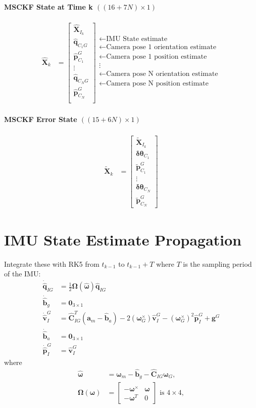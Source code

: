 \documentclass[10pt,letterpaper,fleqn,oneside]{article}
\newcommand{\nl}{\\[0.5em]}
\def\Vec#1{\mathbf{#1}} %
\newcommand{\bbm}{\begin{bmatrix}}
\newcommand{\ebm}{\end{bmatrix}}
\begin{document}
\paragraph{MSCKF State at Time k $((16+7N)\times1)$}
\begin{align}
\hat{\Vec{X}}_k &= \bbm	\hat{\Vec{X}}_{I_k} \nl
										\hat{\Vec{q}}_{C_1 G} \nl
										\hat{\Vec{p}}^G_{C_1} \nl
										\vdots \nl
										\hat{\Vec{q}}_{C_N G} \nl
										\hat{\Vec{p}}^G_{C_N} \nl										
								\ebm
								\begin{array}{l}
								\leftarrow \text{IMU State estimate} \nl
								\leftarrow \text{Camera pose 1 orientation estimate} \nl
								\leftarrow \text{Camera pose 1 position estimate} \nl
								\vdots \nl
								\leftarrow \text{Camera pose N orientation estimate} \nl
								\leftarrow \text{Camera pose N position estimate} \nl
								\end{array}		
\end{align}

\paragraph{MSCKF Error State $((15 + 6N) \times 1)$}
\begin{align}
\widetilde{\Vec{X}}_k &= \bbm	\widetilde{\Vec{X}}_{I_k} \nl
											\boldsymbol{\delta\theta}_{C_1} \nl
											\widetilde{\Vec{p}}^G_{C_1} \nl
											\vdots \nl
											\boldsymbol{\delta\theta}_{C_N} \nl
											\widetilde{\Vec{p}}^G_{C_N}
								\ebm
\end{align}

\section{IMU State Estimate Propagation}
Integrate these with RK5 from $t_{k-1}$ to $t_{k-1} + T$ where $T$ is the sampling period of the IMU:
\begin{align}
\dot{\hat{\Vec{q}}}_{I G} &= \frac{1}{2}\boldsymbol{\Omega}\left(\hat{\boldsymbol{\omega}}\right)\hat{\Vec{q}}_{I G} \nl
\dot{\hat{\Vec{b}}}_g  &= \Vec{0}_{3\times1} \nl
\dot{\hat{\Vec{v}}}^G_I &= \hat{\Vec{C}}_{I G}^T\left(\Vec{a}_m - \hat{\Vec{b}}_a\right) - 2\left(\boldsymbol{\omega}_G^\times\right)\hat{\Vec{v}}^G_I - \left(\boldsymbol{\omega}_G^\times\right)^2 \left.\hat{\Vec{p}}^G_I\right. + \Vec{g}^G \nl
\dot{\hat{\Vec{b}}}_a &= \Vec{0}_{3\times1} \nl
\dot{\hat{\Vec{p}}}^G_I &= \hat{\Vec{v}}^G_I 
\end{align}
where
\begin{align}
\hat{\boldsymbol{\omega}} &= \boldsymbol{\omega}_m - \hat{\Vec{b}}_g - \hat{\Vec{C}}_{I G} \boldsymbol{\omega}_G, \nl
\boldsymbol{\Omega}\left(\boldsymbol{\omega}\right) &= \bbm -\boldsymbol{\omega}^\times & \boldsymbol{\omega} \nl
																										-\boldsymbol{\omega}^T & 0
																								\ebm 
																								\text{ is }4\times4,
\end{align}
\end{document}
